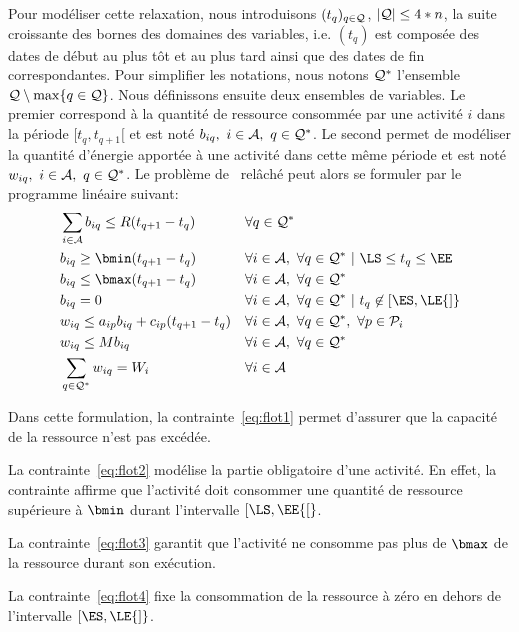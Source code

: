 Pour modéliser cette relaxation, nous introduisons $(t_q)_{q \in {\cal Q}}$,
$| {\cal Q} | \le 4*n$, la suite croissante des bornes des domaines des
variables, i.e. $(t_q)$ est composée des dates de début au plus tôt et
au plus tard ainsi que des dates de fin correspondantes. Pour
simplifier les notations, nous notons ${\cal Q}^* $ l'ensemble ${\cal Q}
\setminus\max\{q \in {\cal Q}\}$. Nous définissons ensuite deux ensembles de
variables. Le premier correspond à la quantité de ressource consommée 
par une activité $i$ dans la période $[t_q,t_{q+1}[$ et est noté
$b_{iq},\ i \in {\cal A},\ q \in {\cal Q}^*$. Le second permet de modéliser la
quantité d'énergie apportée à une activité dans cette même période et
est noté $w_{iq},\ i \in {\cal A},\ q \in {\cal Q}^*$. Le problème de
\CECSP~relâché peut alors se formuler par le programme linéaire suivant:
\begin{align}
  &\sum_{i \in \A} b_{iq} \le R(t_{q+1}- t_q) & & 
  \forall q \in \Q^* \label{eq:flot1}\\
  &b_{iq} \ge \bmin (t_{q+1}-t_q) & & \forall i \in \A,
  \ \forall q \in \Q^*\ | \ \LS \le t_q \le \EE \label{eq:flot2}\\
  &b_{iq} \le \bmax (t_{q+1} - t_q) & &
  \forall i \in \A,\ \forall q \in \Q^* \label{eq:flot3}\\
  &b_{iq}=0 & & \forall i \in \A, \ 
  \forall q \in \Q^*\  |\ t_q \not\in [\ES,\LE{]} \label{eq:flot4}\\  
  &w_{iq} \le a_{ip}b_{iq}+c_{ip}(t_{q+1}-t_q) & &
  \forall i \in \A, \ \forall q \in \Q^*,\  \forall p \in \P_i \label{eq:flot5}\\
  &w_{iq} \le Mb_{iq} & &
  \forall i \in \A,\ \forall q \in \Q^*\ \label{eq:flot6}\\
  &\sum_{q\in \Q^*} w_{iq} = W_i  & &
  \forall i \in \A \label{eq:flot7}
  \end{align}

Dans cette formulation, la contrainte~\eqref{eq:flot1} permet
d'assurer que la capacité de la ressource n'est pas excédée. 

La contrainte~\eqref{eq:flot2} modélise la partie
obligatoire d'une activité. En effet, la contrainte affirme que
l'activité doit consommer une quantité de ressource supérieure à
$\bmin$ durant l'intervalle $[\LS,\EE{[}$.

La contrainte~\eqref{eq:flot3}  garantit que l'activité ne consomme
pas plus de $\bmax$ de la ressource durant son exécution. 

La contrainte~\eqref{eq:flot4} fixe la consommation de la ressource à
zéro en dehors de l'intervalle $[\ES,\LE{]}$.

